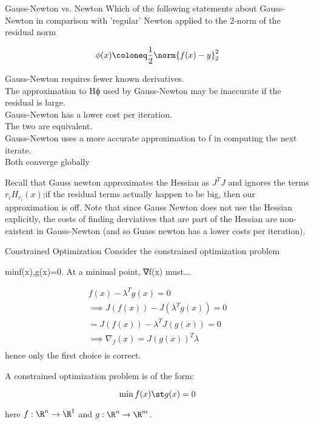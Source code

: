 \documentclass[../main.tex]{subfiles}
\begin{document}
Gauss-Newton vs. Newton
Which of the following statements about Gauss-Newton in comparison with 'regular' Newton applied to the 2-norm of the residual norm

\[
    \phi(x) \coloneq \frac{1}{2}\norm{f(x) - y}_2^2
\]

Gauss-Newton requires fewer known derivatives.  \\
The approximation to Hϕ used by Gauss-Newton may be inaccurate if the residual is large. \\
Gauss-Newton has a lower cost per iteration. \\
The two are equivalent. \\
Gauss-Newton uses a more accurate approximation to f in computing the next iterate. \\
Both converge globally \\

\begin{solution}
    Recall that Gauss newton approximates the Hessian as $J^TJ$ and ignores the terms $r_i H_{r_i}(x)$;if the residual terms actually happen to be big, then our approximation is off. Note that since Gauss Newton does not use the Hessian explicitly, the costs of finding derviatives that are part of the Hessian are non-existent in Gauss-Newton (and so Guass newton has a lower costs per iteration).
\end{solution}

Constrained Optimization
Consider the constrained optimization problem

minf(x),g(x)=0.
At a minimal point, ∇f(x) must...


\begin{solution}
    \begin{align*}
        f(x) - \lambda^T g(x) = 0 \\
        \implies J(f(x)) - J(\lambda^T g(x)) = 0 \\
        = J(f(x)) - \lambda^T J(g(x)) = 0 \\
        \implies \nabla_{f}(x) = J(g(x))^T \lambda \\
    \end{align*}
        hence only the first choice is correct.
\end{solution}



\begin{definition}
    A constrained optimization problem is of the form:

    \[
        \min f(x) \st g(x) = 0
    \]

    here $f: \R^n \to \R^1$ and $g: \R^n \to \R^m$.
\end{definition}
\end{document}
